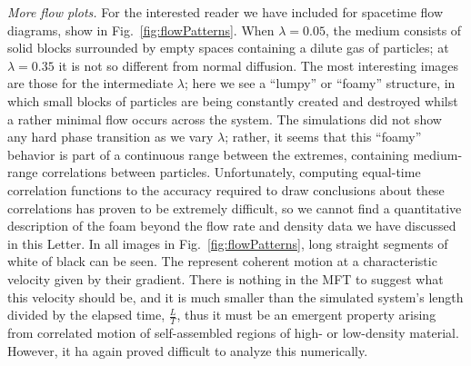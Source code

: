 \documentclass[
reprint,
 amsmath,amssymb,
 aps,
 prl,
]{revtex4-1}
\begin{document}
\textit{More flow plots.} For the interested reader we have included for spacetime flow diagrams, show in Fig.~\ref{fig:flowPatterns}. When $\lambda=0.05$, the medium consists of solid blocks surrounded by empty spaces containing a dilute
gas of particles; at $\lambda=0.35$ it is not so different from normal diffusion.
The most interesting images are those for the intermediate $\lambda$; here we see a ``lumpy'' or ``foamy'' structure, in which small blocks
of particles are being constantly created and destroyed whilst a rather minimal flow occurs across the system.
The simulations did not show any hard phase transition as we vary $\lambda$; rather, it seems that this ``foamy''
behavior is part of a continuous range between the extremes, containing medium-range correlations between particles.
Unfortunately, computing equal-time correlation functions to the accuracy required
to draw conclusions about these correlations has proven to be extremely difficult, so we cannot find a quantitative description of the foam beyond the flow rate and density data we have discussed in this Letter.
In all images in Fig.~\ref{fig:flowPatterns}, long straight segments of white of black can be seen.  The represent coherent motion at a characteristic velocity given by their gradient. There is nothing in the MFT to suggest what this velocity
should be, and it is much smaller than the simulated system's length divided by the elapsed time,  $\frac{L}{T}$, thus it must be an emergent property arising from correlated motion of self-assembled regions of  high- or low-density material.
However, it ha again proved difficult to analyze this numerically.
\end{document}
